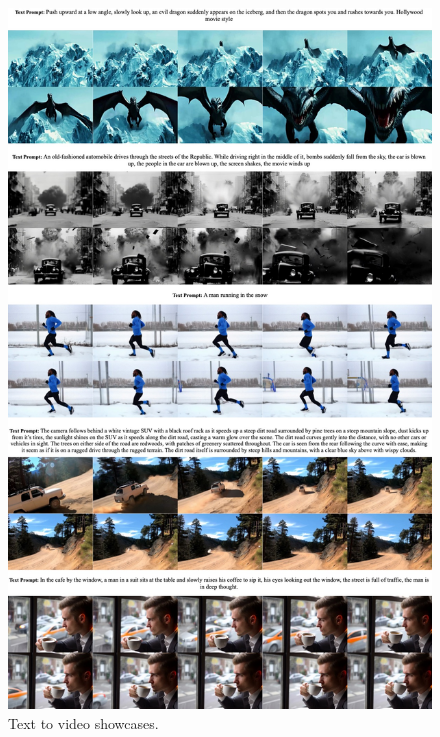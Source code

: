 \begin{figure}[ht]
\begin{center}
\includegraphics[width=0.98\linewidth]{images/t2v/goodcase2.jpg}
\end{center}
\caption{Text to video showcases.}
\label{fig:t2vgood2}
\end{figure}







